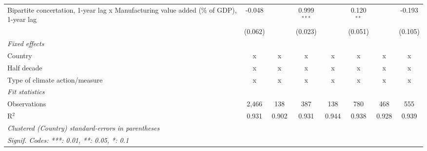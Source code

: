 \begin{table}[htbp]
\begin{tabular}{lccccccc}
      Bipartite concertation, 1-year lag x Manufacturing value added (\% of GDP), 1-year lag  & -0.048        &                           & 0.999$^{***}$   &                  & 0.120$^{**}$    &                 & -0.193\\   
                                                                                              & (0.062)       &                           & (0.023)         &                  & (0.051)         &                 & (0.105)\\   
      \emph{Fixed effects}\\
      Country                                                                                 & x             & x                         & x               & x                & x               & x               & x\\  
      Half decade                                                                             & x             & x                         & x               & x                & x               & x               & x\\  
      Type of climate action/measure                                                          & x             & x                         & x               & x                & x               & x               & x\\  
      \midrule \emph{Fit statistics}\\
      Observations                                                                            & 2,466         & 138                       & 387             & 138              & 780             & 468             & 555\\  
      R$^2$                                                                                   & 0.931         & 0.902                     & 0.931           & 0.944            & 0.938           & 0.928           & 0.939\\  
      \midrule
      \multicolumn{8}{l}{\emph{Clustered (Country) standard-errors in parentheses}}\\
      \multicolumn{8}{l}{\emph{Signif. Codes: ***: 0.01, **: 0.05, *: 0.1}}\\
   \end{tabular}
\end{table}


